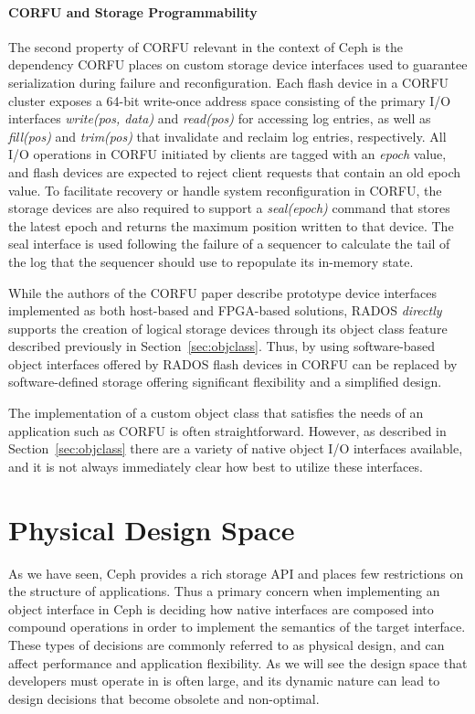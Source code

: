 \documentclass[10pt,twocolumn]{article}
\begin{document}
\paragraph*{CORFU and Storage Programmability}
The second property of CORFU relevant in the context of Ceph is the dependency
CORFU places on custom storage device interfaces used to guarantee
serialization during failure and reconfiguration. Each flash device in a CORFU
cluster exposes a 64-bit write-once address space consisting of the primary I/O
interfaces \emph{write(pos, data)} and \emph{read(pos)} for accessing log
entries, as well as \emph{fill(pos)} and \emph{trim(pos)} that invalidate and
reclaim log entries, respectively. All I/O operations in CORFU initiated by
clients are tagged with an \emph{epoch} value, and flash devices are expected
to reject client requests that contain an old epoch value. To facilitate
recovery or handle system reconfiguration in CORFU, the storage devices are
also required to support a \emph{seal(epoch)} command that stores the latest
epoch and returns the maximum position written to that device. The seal
interface is used following the failure of a sequencer to calculate the tail of
the log that the sequencer should use to repopulate its in-memory state.

While the authors of the CORFU paper describe prototype device interfaces
implemented as both host-based and FPGA-based solutions, RADOS \emph{directly} supports
the creation of logical storage devices through its object class feature
described previously in Section~\ref{sec:objclass}. Thus, by using
software-based object interfaces offered by RADOS flash devices in CORFU can be
replaced by software-defined storage offering significant flexibility and a
simplified design.

The implementation of a custom object class that satisfies the needs of an
application such as CORFU is often straightforward. However, as described in
Section~\ref{sec:objclass} there are a variety of native object I/O interfaces
available, and it is not always immediately clear how best to utilize these
interfaces.

\section{Physical Design Space}
\label{sec:pd}

As we have seen, Ceph provides a rich storage API and places few restrictions
on the structure of applications. Thus a primary concern when implementing an
object interface in Ceph is deciding how native interfaces are composed into
compound operations in order to implement the semantics of the target
interface. These types of decisions are commonly referred to as
physical design, and can affect performance and application flexibility.
As we will see the design space that developers must operate in is often
large, and its dynamic nature can lead to design decisions that become
obsolete and non-optimal.
\end{document}
